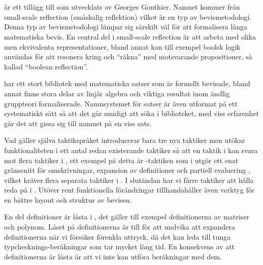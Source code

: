 \section{\ssr{}}
\label{sec:ssr}
\ssr{} är ett tillägg till \coq{} som utvecklats av Georges Gonthier. Namnet
kommer från small-scale reflection (småskalig reflektion) vilket är en typ av
bevismetodologi. Denna typ av bevismetodologi lämpar sig särskilt väl för att
formalisera långa matematiska bevis. En central del i small-scale reflection är
att arbeta med olika men ekvivalenta representationer, bland annat kan till
exempel boolsk logik användas för att resonera kring och ``räkna'' med
motsvarande propositioner, så kallad ``boolean reflection''.

\ssr{} har ett stort bibliotek med matematiska satser som är formellt bevisade,
bland annat finns stora delar av linjär algebra och viktiga resultat inom
ändlig gruppteori formaliserade. Namnsystemet för satser är även utformat på
ett systematiskt sätt så att det går smidigt att söka i biblioteket, med viss
erfarenhet går det att gissa sig till namnet på en viss sats.

Vad gäller själva taktikspråket introducerar \ssr{} bara tre nya taktiker men
utökar funktionaliteten i ett antal redan existerande taktiker så att en taktik
i \ssr{} kan svara mot flera taktiker i \coq, ett exempel på detta är
-taktiken som i \ssr{} utgör ett enat gränssnitt för omskrivningar,
expansion av definitioner och partiell evaluering \cite{gonthier2008small},
vilket kräver flera separata taktiker i \coq. I slutändan har vi färre taktiker
att hålla reda på i \ssr{}. Utöver rent funktionella förändringar
tillhandahåller \ssr{} även verktyg för en bättre layout och struktur av
bevisen.

En del definitioner är låsta i \ssr{}, det gäller till exempel definitionerna
av matriser och polynom. Låset på definitionerna är till för att undvika att
expandera definitionerna när vi försöker förenkla uttryck, då det kan leda till
tunga typchecknings-beräkningar som tar mycket lång tid. En konsekvens av att
definitionerna är låsta är att vi inte kan utföra beräkningar med dem.
